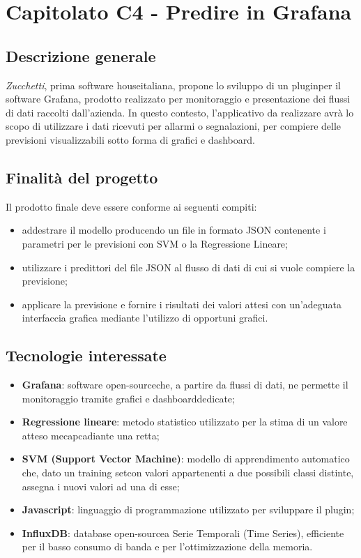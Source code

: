 \section{Capitolato C4 - Predire in Grafana}

\subsection{Descrizione generale}
\textit{Zucchetti}, prima software house\glo italiana, propone lo sviluppo di un plugin\glo per il software Grafana, prodotto realizzato per monitoraggio e presentazione dei flussi di dati raccolti dall'azienda. In questo contesto, l'applicativo da realizzare avrà lo scopo di utilizzare i dati ricevuti per allarmi o segnalazioni, per compiere delle previsioni visualizzabili sotto forma di grafici e dashboard\glos.

\subsection{Finalità del progetto}
Il prodotto finale deve essere conforme ai seguenti compiti:
\begin{itemize}
	\item addestrare il modello producendo un file in formato JSON contenente i parametri per le previsioni con SVM o la Regressione Lineare;
	\item utilizzare i predittori del file JSON al flusso di dati di cui si vuole compiere la previsione;
	\item applicare la previsione e fornire i risultati dei valori attesi con un'adeguata interfaccia grafica mediante l'utilizzo di opportuni grafici.
\end{itemize}

\subsection{Tecnologie interessate}
\begin{itemize}
	\item \textbf{Grafana}: software open-source\glo che, a partire da flussi di dati, ne permette il monitoraggio tramite grafici e dashboard\glo dedicate;
	\item \textbf{Regressione lineare}: metodo statistico utilizzato per la stima di un valore atteso mecapcadiante una retta;
	\item \textbf{SVM (Support Vector Machine)}:  modello di apprendimento automatico che, dato un training set\glo con valori appartenenti a due possibili classi distinte, assegna i nuovi valori ad una di esse;
	\item \textbf{Javascript}: linguaggio di programmazione utilizzato per sviluppare il plugin\glos;
	\item \textbf{InfluxDB}: database open-source\glo a Serie Temporali (Time Series\glos), efficiente per il basso consumo di banda e per l'ottimizzazione della memoria.
\end{itemize}

